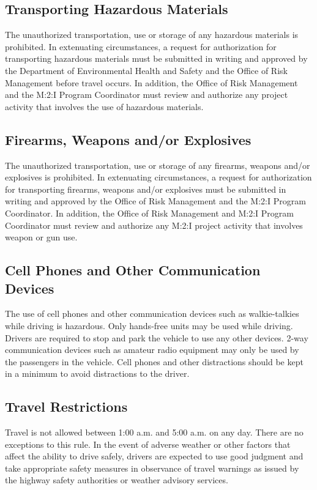 {\subsection{Transporting Hazardous Materials}

The unauthorized transportation, use or storage of any hazardous materials is prohibited. In extenuating circumstances, a request for authorization for transporting hazardous materials must be submitted in writing and approved by the Department of Environmental Health and Safety and the Office of Risk Management before travel occurs. In addition, the Office of Risk Management and the M:2:I Program Coordinator must review and authorize any project activity that involves the use of hazardous materials.

\subsection{Firearms, Weapons and/or Explosives}

The unauthorized transportation, use or storage of any firearms, weapons and/or explosives is prohibited. In extenuating circumstances, a request for authorization for transporting firearms, weapons and/or explosives must be submitted in writing and approved by the Office of Risk Management and the M:2:I Program Coordinator. In addition, the Office of Risk Management and M:2:I Program Coordinator must review and authorize any M:2:I project activity that involves weapon or gun use.

\subsection{Cell Phones and Other Communication Devices}

The use of cell phones and other communication devices such as walkie-talkies while driving is hazardous. Only hands-free units may be used while driving. Drivers are required to stop and park the vehicle to use any other devices.  2-way communication devices such as amateur radio equipment may only be used by the passengers in the vehicle.  Cell phones and other distractions should be kept in a minimum to avoid distractions to the driver.

\subsection{Travel Restrictions}

Travel is not allowed between 1:00 a.m. and 5:00 a.m. on any day.  There are no exceptions to this rule.  In the event of adverse weather or other factors that affect the ability to drive safely, drivers are expected to use good judgment and take appropriate safety measures in observance of travel warnings as issued by the highway safety authorities or weather advisory services.

}
